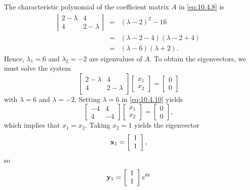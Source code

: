 \begin{examplesolution}
 The characteristic polynomial of the coefficient matrix $A$ in \eqref{eq:10.4.8} is
\begin{eqnarray*}
  \left|
  \begin{array}{cc}
    2-\lambda & 4         \\
    4         & 2-\lambda
  \end{array}\right| &=&(\lambda-2)^{2}-16\\ &=&(\lambda-2-4)(\lambda-2+4)\\ &=&(\lambda-6)(\lambda+2).
\end{eqnarray*}
Hence, $\lambda_{1}=6$ and $\lambda_{2}=-2$ are eigenvalues of $A$. To obtain the eigenvectors, we
must solve the system
\begin{equation}
  \label{eq:10.4.10}\left[
  \begin{array}{cc}
    2-\lambda & 4         \\
    4         & 2-\lambda
  \end{array}\right] \left[
  \begin{array}{c}
    x_{1} \\
    x_{2}
  \end{array}\right]= \left[
  \begin{array}{c}
    0 \\
    0
  \end{array}\right]
\end{equation}
with $\lambda=6$ and $\lambda=-2$. Setting $\lambda=6$ in \eqref{eq:10.4.10} yields
\[
  \left[
  \begin{array}{rr}
    -4 & 4  \\
    4  & -4
  \end{array}\right]\left[
  \begin{array}{c}
    x_{1} \\
    x_{2}
  \end{array}\right]=\left[
  \begin{array}{c}
    0 \\
    0
  \end{array}
  \right],
\]
which implies that $x_{1}=x_{2}$. Taking $x_{2}=1$ yields the eigenvector
\[
  {\bf x}_{1}=\left[
  \begin{array}{c}
    1 \\
    1
  \end{array}\right],
\]
so
\[
  {\bf y}_{1}=\left[
  \begin{array}{c}
    1 \\
    1
  \end{array}\right]e^{6t}
\]
\end{examplesolution}
